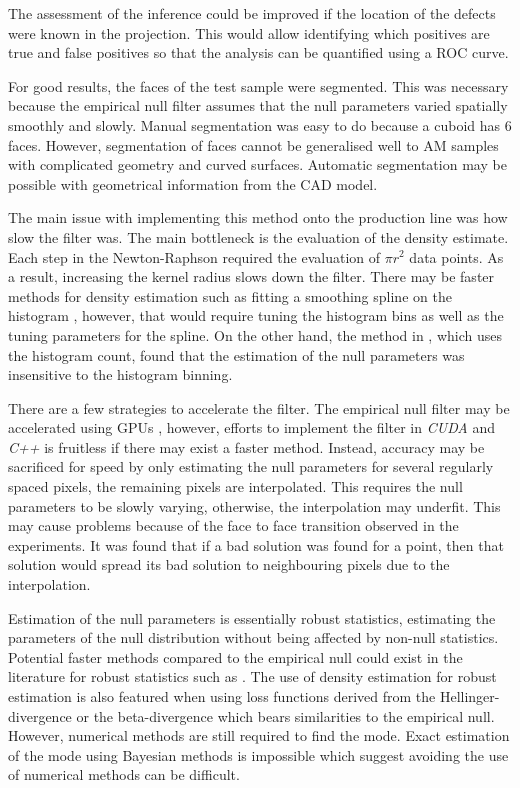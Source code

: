 The assessment of the inference could be improved if the location of the defects were known in the projection. This would allow identifying which positives are true and false positives so that the analysis can be quantified using a ROC curve.

For good results, the faces of the test sample were segmented. This was necessary because the empirical null filter assumes that the null parameters varied spatially smoothly and slowly. Manual segmentation was easy to do because a cuboid has 6 faces. However, segmentation of faces cannot be generalised well to AM samples with complicated geometry and curved surfaces. Automatic segmentation may be possible with geometrical information from the CAD model.

The main issue with implementing this method onto the production line was how slow the filter was. The main bottleneck is the evaluation of the density estimate. Each step in the Newton-Raphson required the evaluation of $\pi r^2$ data points. As a result, increasing the kernel radius slows down the filter. There may be faster methods for density estimation such as fitting a smoothing spline on the histogram \citep{efron2004large}, however, that would require tuning the histogram bins as well as the tuning parameters for the spline. On the other hand, the method in \cite{schwartzman2008empirical}, which uses the histogram count, found that the estimation of the null parameters was insensitive to the histogram binning.

There are a few strategies to accelerate the filter. The empirical null filter may be accelerated using GPUs \citep{yang2008parallel, hwu2011gpu, eklund2013medical}, however, efforts to implement the filter in \emph{CUDA} and \emph{C++} is fruitless if there may exist a faster method. Instead, accuracy may be sacrificed for speed by only estimating the null parameters for several regularly spaced pixels, the remaining pixels are interpolated. This requires the null parameters to be slowly varying, otherwise, the interpolation may underfit. This may cause problems because of the face to face transition observed in the experiments. It was found that if a bad solution was found for a point, then that solution would spread its bad solution to neighbouring pixels due to the interpolation.

Estimation of the null parameters is essentially robust statistics, estimating the parameters of the null distribution without being affected by non-null statistics. Potential faster methods compared to the empirical null could exist in the literature for robust statistics such as \cite{hampel1986robust, rousseeuw1987robust, maronna2006robust, huber2009robust, jewson2018principles}. The use of density estimation for robust estimation is also featured when using loss functions derived from the Hellinger-divergence \citep{beran1977minimum, jewson2018principles} or the beta-divergence \citep{basu1998robust, jewson2018principles} which bears similarities to the empirical null. However, numerical methods are still required to find the mode. Exact estimation of the mode using Bayesian methods is impossible \citep{heinrich2013the} which suggest avoiding the use of numerical methods can be difficult.


